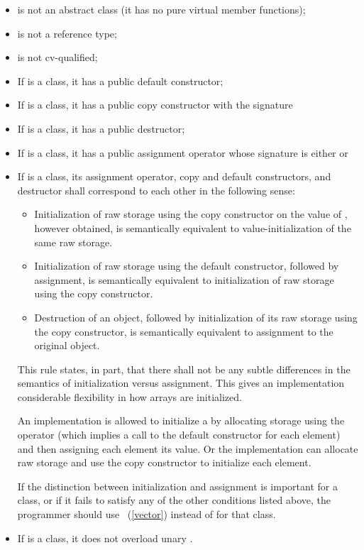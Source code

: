 \begin{itemize}
\item {} is not an abstract class (it has no pure virtual member functions);
\item {} is not a reference type;
\item {} is not cv-qualified;
\item If  is a class, it has a public default constructor;
\item If  is a class, it has a public copy constructor with the signature 
\item If  is a class, it has a public destructor;
\item If  is a class, it has a public assignment operator whose signature is either
or
\item If  is a class, its assignment operator, copy and default constructors,
and destructor shall correspond to each other in the following sense:
 \begin{itemize}
 \item Initialization of raw storage using the copy constructor
   on the value of , however obtained,
   is semantically equivalent to value-initialization of the same raw storage.
 \item Initialization of raw storage using the default constructor,
   followed by assignment,
   is semantically equivalent to initialization of raw storage using the copy constructor.
 \item Destruction of an object,
   followed by initialization of its raw storage using the copy constructor,
    is semantically equivalent to assignment to the original object.
 \end{itemize}

\begin{note}
This rule states, in part, that there shall not be any subtle differences in the semantics
of initialization versus assignment.
This gives an implementation
considerable flexibility in how arrays are initialized.

\begin{example}
An implementation is allowed to initialize a
by allocating storage using the
operator (which
implies a call to the default constructor for each element) and then
assigning each element its value.
Or the implementation can allocate raw
storage and use the copy constructor to initialize each element.
\end{example}

If the distinction between initialization and assignment is important
for a class, or if it fails to satisfy any of
the other conditions listed above, the programmer should use
~(\ref{vector}) instead of
for that class.
\end{note}
\item If  is a class, it does not overload unary
.
\end{itemize}

